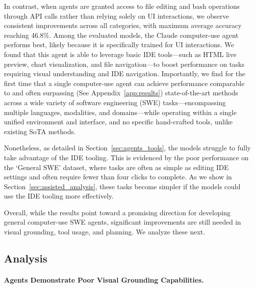 In contrast, when agents are granted access to file editing and bash operations through API calls rather than relying solely on UI interactions, we observe consistent improvements across all categories, with maximum average accuracy reaching 46.8\%.
Among the evaluated models, the Claude computer-use agent performs best, likely because it is specifically trained for UI interactions.
We found that this agent is able to leverage basic IDE tools—such as HTML live preview, chart visualization, and file navigation—to boost performance on tasks requiring visual understanding and IDE navigation.
Importantly, we find for the first time that a single computer-use agent can achieve performance comparable to and often surpassing (See Appendix~\ref{app:results}) state-of-the-art methods across a wide variety of software engineering (SWE) tasks—encompassing multiple languages, modalities, and domains—while operating within a single unified environment and interface, and no specific hand-crafted tools, unlike existing SoTA methods.


Nonetheless, as detailed in Section~\ref{sec:agents_tools}, the models struggle to fully take advantage of the IDE tooling.
This is evidenced by the poor performance on the `General SWE' dataset, where tasks are often as simple as editing IDE settings and often require fewer than four clicks to complete.
As we show in Section~\ref{sec:assisted_analysis}, these tasks become simpler if the models could use the IDE tooling more effectively.

Overall, while the results point toward a promising direction for developing general computer-use SWE agents, significant improvements are still needed in visual grounding, tool usage, and planning. We analyze these next.

\subsection{Analysis}
\label{sec:analysis}

\paragraph{Agents Demonstrate Poor Visual Grounding Capabilities.}



